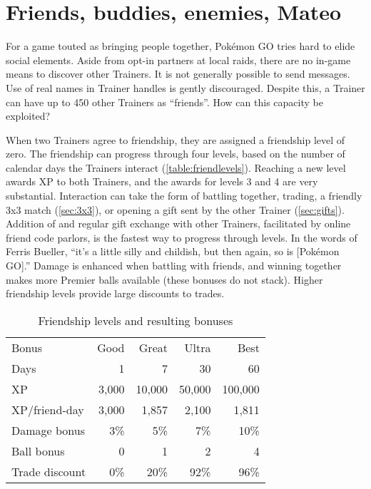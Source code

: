 \chapter{Friends, buddies, enemies, Mateo\label{chap:friends}}
For a game touted as bringing people together, Pokémon GO tries hard to elide social elements.
Aside from opt-in partners at local raids, there are no in-game means to discover other Trainers.
It is not generally possible to send messages.
Use of real names in Trainer handles is gently discouraged.
Despite this, a Trainer can have up to 450 other Trainers as ``friends''.
How can this capacity be exploited?

When two Trainers agree to friendship, they are assigned a friendship level of zero.
The friendship can progress through four levels, based on the number of calendar
  days the Trainers interact (\autoref{table:friendlevels}).
Reaching a new level awards XP to both Trainers, and the awards for levels 3 and 4 are very substantial.
Interaction can take the form of battling together, trading, a friendly 3x3 match (\autoref{sec:3x3}), or
  opening a gift sent by the other Trainer (\autoref{sec:gifts}).
Addition of and regular gift exchange with other Trainers, facilitated by online friend code parlors,
  is the fastest way to progress through levels.
In the words of Ferris Bueller, ``it's a little silly and childish, but then again, so is [Pokémon GO].''
Damage is enhanced when battling with friends, and winning together
  makes more Premier balls available (these bonuses do not stack).
Higher friendship levels provide large discounts to trades.
\begin{table}
\centering
\begin{tabular}{lrrrr}
Bonus & Good & Great & Ultra & Best\\
\Midrule
Days & 1 & 7 & 30 & 60\\
XP  & 3,000 & 10,000 & 50,000 & 100,000\\
XP/friend-day & 3,000 & 1,857 & 2,100 & 1,811\\
Damage bonus & 3\% & 5\% & 7\% & 10\%\\
Ball bonus & 0 & 1 & 2 & 4\\
Trade discount & 0\% & 20\% & 92\% & 96\% \\
\end{tabular}
  \caption{Friendship levels and resulting bonuses\label{table:friendlevels}}
\end{table}

